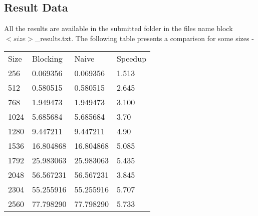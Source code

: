 \documentclass[a4paper]{article}
\begin{document}
\subsection{\color{db}Result Data}
All the results are available in the submitted folder in the files name block$<size>$\_results.txt. The following table presents a comparison for some sizes - \\
\begin{tabular}{| l|l|l|l|}
Size & Blocking & Naive & Speedup \\ 
256  & 0.069356 & 0.069356 & 1.513   \\         
512  & 0.580515 & 0.580515 & 2.645  \\
768  & 1.949473 & 1.949473 & 3.100  \\
1024 &  5.685684 & 5.685684 &  3.70  \\
1280 &  9.447211 & 9.447211 &  4.90  \\ 
1536 &  16.804868 & 16.804868 &  5.085 \\
1792 &  25.983063 & 25.983063 & 5.435 \\
2048 &  56.567231 & 56.567231 & 3.845  \\
2304 &  55.255916 & 55.255916 & 5.707 \\
2560 &  77.798290 & 77.798290 & 5.733 \\

\end{tabular}
\clearpage
\end{document}
